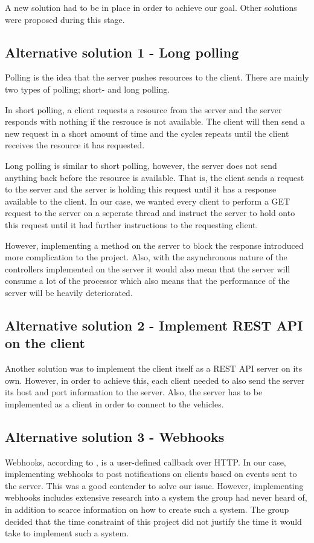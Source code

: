 A new solution had to be in place in order to achieve our goal. Other solutions were proposed during this stage.

\subsection{Alternative solution 1 - Long polling}
Polling is the idea that the server pushes resources to the client. There are mainly two types of polling; short- and long polling. 

In short polling, a client requests a resource from the server and the server responds with nothing if the resrouce is not available. The client will then send a new request in a short amount of time and the cycles repeats until the client receives the resource it has requested.

Long polling is similar to short polling, however, the server does not send anything back before the resource is available. That is, the client sends a request to the server and the server is holding this request until it has a response available to the client. In our case, we wanted every client to perform a GET request to the server on a seperate thread and instruct the server to hold onto this request until it had further instructions to the requesting client.

However, implementing a method on the server to block the response introduced more complication to the project. Also, with the asynchronous nature of the controllers implemented on the server it would also mean that the server will consume a lot of the processor which also means that the performance of the server will be heavily deteriorated.

\subsection{Alternative solution 2 - Implement REST API on the client}
Another solution was to implement the client itself as a REST API server on its own. However, in order to achieve this, each client needed to also send the server its host and port information to the server. Also, the server has to be implemented as a client in order to connect to the vehicles.

\subsection{Alternative solution 3 - Webhooks}
Webhooks, according to \cite{webhooks}, is a user-defined callback over HTTP. In our case, implementing webhooks to post notifications on clients based on events sent to the server. This was a good contender to solve our issue. However, implementing webhooks includes extensive research into a system the group had never heard of, in addition to scarce information on how to create such a system. The group decided that the time constraint of this project did not justify the time it would take to implement such a system.
